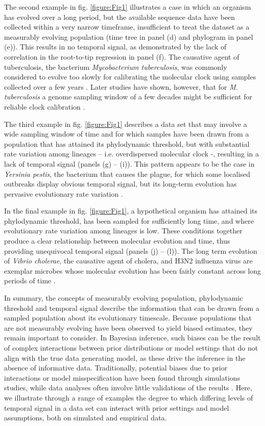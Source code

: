 \documentclass[11pt]{article}
\begin{document}
The second example in fig. \ref{figure:Fig1} illustrates a case in which an organism has evolved over a long period, but the available sequence data have been collected within a very narrow timeframe, insufficient to treat the dataset as a measurably evolving population (time tree in panel (d) and phylogram in panel (e)). This results in no temporal signal, as demonstrated by the lack of correlation in the root-to-tip regression in panel (f). The causative agent of tuberculosis, the bacterium \textit{Mycobacterium tuberculosis}, was commonly considered to evolve too slowly for calibrating the molecular clock using samples collected over a few years \cite{duchene2016genome}. Later studies have shown, however, that for \textit{M. tuberculosis} a genome sampling window of a few decades might be sufficient for reliable clock calibration \citep{menardo2019molecular}. 
 
The third example in fig. \ref{figure:Fig1} describes a data set that may involve a wide sampling window of time and for which samples have been drawn from a population that has attained its phylodynamic threshold, but with substantial rate variation among lineages – i.e. overdispersed molecular clock -,  resulting in a lack of temporal signal (panels (g) – (i)). This pattern appears to be the case in \textit{Yersinia pestis}, the bacterium that causes the plague, for which some localised outbreaks display obvious temporal signal, but its long-term evolution has pervasive evolutionary rate variation \citep{eaton2023plagued}. 

In the final example in fig. \ref{figure:Fig1}, a hypothetical organism has attained its phylodynamic threshold, has been sampled for sufficiently long time, and where evolutionary rate variation among lineages is low. These conditions together produce a clear relationship between molecular evolution and time, thus providing unequivocal temporal signal (panels (j) – (l)). The long term evolution of \textit{Vibrio cholerae}, the causative agent of cholera, and H3N2 influenza virus are exemplar microbes whose molecular evolution has been fairly constant across long periods of time \citep{devault2014second, rambaut2016exploring}.

In summary, the concepts of measurably evolving population, phylodynamic threshold and temporal signal describe the information that can be drawn from a sampled population about its evolutionary timescale. Because populations that are not measurably evolving have been observed to yield biased estimates, they remain important to consider. In Bayesian inference, such biases can be the result of complex interactions between prior distributions or model settings that do not align with the true data generating model, as these drive the inference in the absence of informative data. Traditionally, potential biases due to prior interactions \citep{tay2024assessing} or model misspecification \citep{moller2018impact} have been found through simulations studies, while data analyses often involve little validations of the results \citep{mendes2025validate}. Here, we illustrate through a range of examples the degree to which differing levels of temporal signal in a data set can interact with prior settings and model assumptions, both on simulated and empirical data. 
\end{document}
